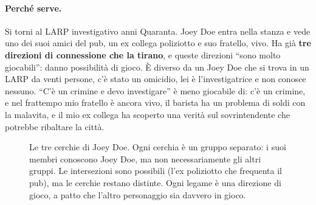 \paragraph{Perché serve.} Si torni al LARP investigativo anni Quaranta. Joey Doe
entra nella stanza e vede uno dei suoi amici del pub, un ex collega poliziotto e
suo fratello, vivo. Ha già \textbf{tre direzioni di connessione che la tirano}, e
queste direzioni ``sono molto giocabili'': danno possibilità di gioco. È diverso da
un Joey Doe che si trova in un LARP da venti persone, c'è stato un omicidio, lei è
l'investigatrice e non conosce nessuno. ``C'è un crimine e devo investigare'' è
meno giocabile di: c'è un crimine, e nel frattempo mio fratello è ancora vivo, il
barista ha un problema di soldi con la malavita, e il mio ex collega ha scoperto
una verità sul sovrintendente che potrebbe ribaltare la città.

\begin{figure}[htbp]
\centering
{}
\caption{Le tre cerchie di Joey Doe. Ogni cerchia è un gruppo separato: i suoi
membri conoscono Joey Doe, ma non necessariamente gli altri gruppi. Le
intersezioni sono possibili (l'ex poliziotto che frequenta il pub), ma le cerchie
restano distinte. Ogni legame è una direzione di gioco, a patto che l'altro
personaggio sia davvero in gioco.}
\label{a4:fig:cerchie}
\end{figure}

